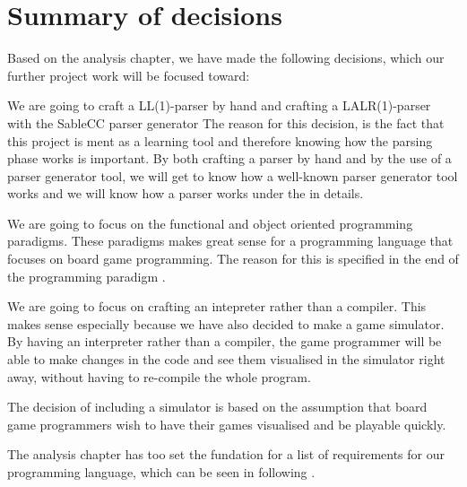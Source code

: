 \section{Summary of decisions}
\label{sec:summaryofdecisions}

Based on the analysis chapter, we have made the following decisions, which our further project work will be focused toward:

We are going to craft a LL(1)-parser by hand and crafting a LALR(1)-parser with the SableCC parser generator
The reason for this decision, is the fact that this project is ment as a learning tool and therefore knowing how the parsing
phase works is important. By both crafting a parser by hand and by the use of a parser generator tool, we will get to know
how a well-known parser generator tool works and we will know how a parser works under the in details.

We are going to focus on the functional and object oriented programming paradigms. These paradigms makes great sense for a programming
language that focuses on board game programming. The reason for this is specified in the end of the programming paradigm .

We are going to focus on crafting an intepreter rather than a compiler. This makes sense especially because we have also decided to make a game simulator.
By having an interpreter rather than a compiler, the game programmer will be able to make changes in the code and see them visualised in the simulator right away, without having to re-compile the whole program.

The decision of including a simulator is based on the assumption that board game programmers wish to have their games visualised and be playable quickly.

The analysis chapter has too set the fundation for a list of requirements for our programming language, which can be seen in following .    